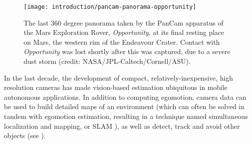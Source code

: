 % 
\begin{figure}
  \begin{center}
  	\vspace{-10pt}
    \texttt{[image: introduction/pancam-panorama-opportunity]}
     \vspace{-15pt}
  \end{center}
  \caption{The last 360 degree panorama taken by the PanCam apparatus of the Mars Exploration Rover, \textit{Opportunity}, at its final resting place on Mars, the western rim of the Endeavour Crater. Contact with \textit{Opportunity} was lost shortly after this was captured, due to a severe dust storm (credit: NASA/JPL-Caltech/Cornell/ASU).}
  \vspace{-5pt}
  \label{fig:into_rur}
\end{figure}







 
In the last decade, the development of compact, relatively-inexpensive, high resolution cameras has made vision-based estimation ubiquitous in mobile autonomous applications. In addition to computing egomotion, camera data can be used to build detailed maps of an environment (which can often be solved in tandem with egomotion estimation, resulting in a technique named simultaneous localization and mapping, or SLAM \citep{Cadena2016-ds}), as well as detect, track and avoid other objects (see ). 

